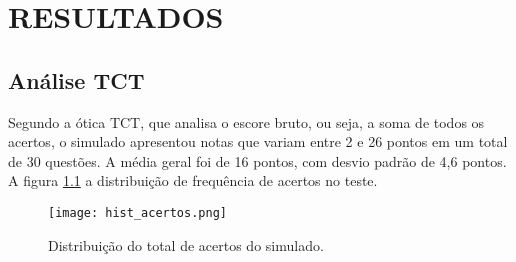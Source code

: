 \chapter{RESULTADOS}

\section{Análise TCT}

Segundo a ótica TCT, que analisa o escore bruto, ou seja, a soma de todos os acertos, o simulado apresentou notas que variam entre 2 e 26 pontos em um total de 30 questões. A média geral foi de 16 pontos, com desvio padrão de 4,6 pontos. A figura \ref{fig:hist_acertos} a distribuição de frequência de acertos no teste.

\begin{figure}[H]
	\centering
	\texttt{[image: hist\_acertos.png]}
	\caption{Distribuição do total de acertos do simulado.}
	\label{fig:hist_acertos}
\end{figure}

